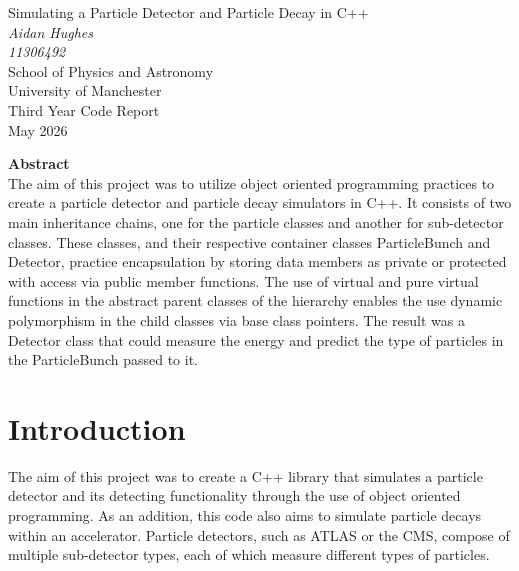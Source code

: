 \documentclass[11pt]{article} %
\begin{document}
\begin{titlepage} %
\begin{center} %

{\Huge Simulating a Particle Detector and Particle Decay in C++ }\\[0.5cm] %
\textit{Aidan Hughes}~\\[0.3cm] %
\textit{11306492}~\\[0.3cm]
School of Physics and Astronomy~\\[0.3cm]
University of Manchester~\\[0.3cm]
Third Year Code Report~\\[0.3cm]
May 2026~\\[2cm]



\end{center}
{\textbf{Abstract}}~\\[0.3cm]
The aim of this project was to utilize object oriented programming practices to create a particle detector and particle decay simulators in C++. It consists of two main inheritance chains, one for the particle classes and another for sub-detector classes. These classes, and their respective container classes ParticleBunch and Detector, practice encapsulation by storing data members as private or protected with access via public member functions. The use of virtual and pure virtual functions in the abstract parent classes of the hierarchy enables the use dynamic polymorphism in the child classes via base class pointers. The result was a Detector class that could measure the energy  and predict the type of particles in the ParticleBunch passed to it. 
\end{titlepage}
\clearpage
{} %
\setcounter{page}{2} %

\newpage %

\section{Introduction} 
\label{intro}
The aim of this project was to create a C++ library that simulates a particle detector and its detecting functionality through the use of object oriented programming. As an addition, this code also aims to simulate particle decays within an accelerator. Particle detectors, such as ATLAS or the CMS, compose of multiple sub-detector types, each of which measure different types of particles. 
\end{document}
